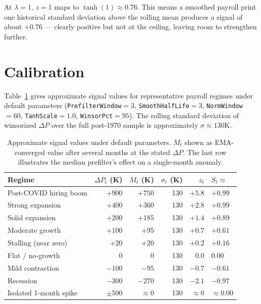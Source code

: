 \documentclass[11pt, a4paper]{article}
\newcommand{\dP}{\Delta P}
\begin{document}
At $\lambda = 1$, $z = 1$ maps to $\tanh(1) \approx 0.76$. This
means a smoothed payroll print one historical standard deviation
above the rolling mean produces a signal of about $+0.76$ — clearly
positive but not at the ceiling, leaving room to strengthen further.

\section{Calibration}
\label{sec:calibration}

Table~\ref{tab:calib} gives approximate signal values for
representative payroll regimes under default parameters
(\texttt{PrefilterWindow}$=3$, \texttt{SmoothHalfLife}$=3$,
\texttt{NormWindow}$=60$, \texttt{TanhScale}$=1.0$, \texttt{WinsorPct}$=95$).
The rolling standard deviation of winsorized $\dP$ over the full
post-1970 sample is approximately $\sigma \approx 130$K.

\begin{table}[H]
\centering
\renewcommand{\arraystretch}{1.35}
\begin{tabular}{lrrrrl}
\toprule
\textbf{Regime} & $\dP_t$ (K) & $M_t$ (K) & $\sigma_t$ (K) & $z_t$ & $S_t \approx$ \\
\midrule
Post-COVID hiring boom     & $+900$  & $+750$  & 130 & $+5.8$ & $+0.99$ \\
Strong expansion           & $+400$  & $+360$  & 130 & $+2.8$ & $+0.99$ \\
Solid expansion            & $+200$  & $+185$  & 130 & $+1.4$ & $+0.89$ \\
Moderate growth            & $+100$  & $+95$   & 130 & $+0.7$ & $+0.61$ \\
Stalling (near zero)       & $+20$   & $+20$   & 130 & $+0.2$ & $+0.16$ \\
Flat / no-growth           & $0$     & $0$     & 130 & $0.0$  & $0.00$  \\
Mild contraction           & $-100$  & $-95$   & 130 & $-0.7$ & $-0.61$ \\
Recession                  & $-300$  & $-270$  & 130 & $-2.1$ & $-0.97$ \\
Isolated 1-month spike     & $\pm500$ & $\approx 0$ & 130 & $\approx 0$ & $\approx 0.00$ \\
\bottomrule
\end{tabular}
\caption{Approximate signal values under default parameters.
$M_t$ shown as EMA-converged value after several months at the stated $\dP$.
The last row illustrates the median prefilter's effect on a single-month anomaly.}
\label{tab:calib}
\end{table}
\end{document}
